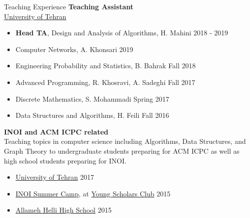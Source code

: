 \documentclass{resume} %
\begin{document}

\begin{rSection}{Teaching Experience}
	{\bf Teaching Assistant}
	\\\href{http://ut.ac.ir/en}{University of Tehran}
	\begin{itemize}
		\item {\bf Head TA}, Design and Analysis of Algorithms, H. Mahini \hfill 2018 - 2019 
		\item Computer Networks, A. Khonsari \hfill 2019 
		\item Engineering Probability and Statistics, B. Bahrak \hfill Fall 2018
		\item Advanced Programming, R. Khosravi, A. Sadeghi \hfill Fall 2017
		\item Discrete Mathematics, S. Mohammadi \hfill Spring 2017
		\item Data Structures and Algorithms, H. Feili \hfill Fall 2016
	\end{itemize}
	
	{\bf INOI and ACM ICPC related}
	\\Teaching topics in computer science including Algorithms, Data Structures,
	and Graph Theory to undergraduate students preparing for ACM ICPC as well as high school
	students preparing for INOI.
	\begin{itemize}
		\item \href{http://ut.ac.ir/en}{University of Tehran} \hfill 2017
		\item \href{http://inoi.ir/}{INOI Summer Camp}, at \href{http://ysc.ac.ir/}{Young Scholars Club} \hfill 2015
		\item \href{http://www.helli.ir/}{Allameh Helli High School} \hfill 2015
	\end{itemize}
\end{rSection}
\end{document}
